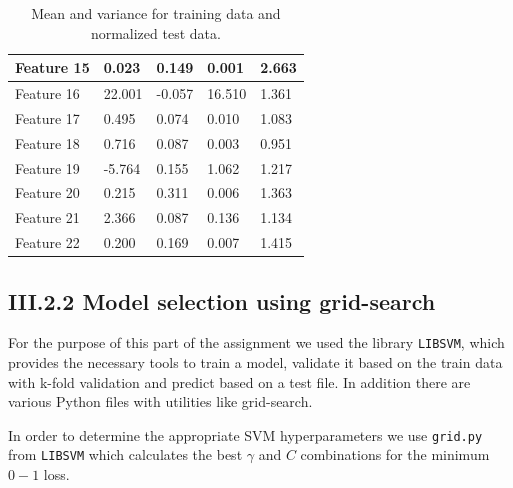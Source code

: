 \documentclass[12pt]{article}
\begin{document}
\begin{table}[h]
\begin{tabular}{l|l|l|l|l|}
      \multicolumn{1}{|l|}{Feature 15}  & 0.023         & 0.149         & 0.001          & 2.663         \\ \hline                         
      \multicolumn{1}{|l|}{Feature 16}  & 22.001        & -0.057        & 16.510         & 1.361         \\ \hline                         
      \multicolumn{1}{|l|}{Feature 17}  & 0.495         & 0.074         & 0.010          & 1.083         \\ \hline                         
      \multicolumn{1}{|l|}{Feature 18}  & 0.716         & 0.087         & 0.003          & 0.951         \\ \hline                         
      \multicolumn{1}{|l|}{Feature 19}  & -5.764        & 0.155         & 1.062          & 1.217         \\ \hline                         
      \multicolumn{1}{|l|}{Feature 20}  & 0.215         & 0.311         & 0.006          & 1.363         \\ \hline                         
      \multicolumn{1}{|l|}{Feature 21}  & 2.366         & 0.087         & 0.136          & 1.134         \\ \hline                         
      \multicolumn{1}{|l|}{Feature 22}  & 0.200         & 0.169         & 0.007          & 1.415         \\ \hline
      \end{tabular}
      \caption{Mean and variance for training data and normalized test data.}
      \label{table:mean_var_train_norm_test}
    \end{table}

  \subsection*{III.2.2 Model selection using grid-search}
    For the purpose of this part of the assignment we used the library \texttt{LIBSVM}, which provides the necessary tools to train a model, validate it based on the train data with k-fold validation and predict based on a test file. In addition there are various Python files with utilities like grid-search. 
 

    In order to determine the appropriate SVM hyperparameters we use \texttt{grid.py} from \texttt{LIBSVM} which calculates the best $\gamma$ and $C$ combinations for the minimum $0-1$ loss. 
 
\end{document}
